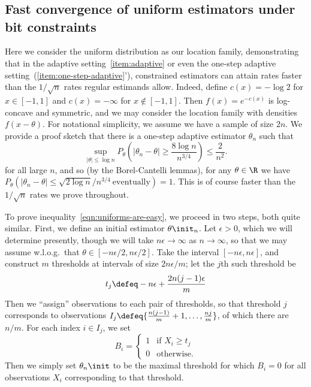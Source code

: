 
\section{}

\subsection{Fast convergence of uniform estimators under bit constraints}
\label{sec:uniform-weirdos}

Here we consider the uniform distribution as our location family,
demonstrating that in the adaptive setting~\eqref{item:adaptive} or even the
one-step adaptive setting~(\ref{item:one-step-adaptive}'), constrained
estimators can attain rates faster than the $1 / \sqrt{n}$ rates regular
estimands allow. Indeed, define $c(x) = -\log 2$ for $x \in [-1, 1]$ and
$c(x) = -\infty$ for $x \not \in [-1, 1]$. Then $f(x) = e^{-c(x)}$ is
log-concave and symmetric, and we may consider the location family with
densities $f(x - \theta)$. For notational simplicity, we assume we have
a sample of size $2n$. We provide a proof sketch that
there is a one-step adaptive estimator $\theta_n$ such that
\begin{equation}
  \label{eqn:uniforms-are-easy}
  \sup_{|\theta| \le \log n}
  P_\theta\left(|\theta_n - \theta| \ge \frac{8 \log n}{n^{3/4}}\right)
  \le \frac{2}{n^2}.
\end{equation}
for all large $n$,
and so (by the Borel-Cantelli lemmas), for any $\theta \in \R$ we have
$P_\theta(|\theta_n - \theta| \le \sqrt{2 \log n} / n^{3/4} ~
\mbox{eventually}) = 1$. This is of course faster than the $1/\sqrt{n}$
rates we prove throughout.

To prove inequality~\eqref{eqn:uniforms-are-easy}, we proceed in two steps,
both quite similar.
First, we define an initial estimator $\theta\init_n$.
Let $\epsilon > 0$, which we will determine presently, though we will
take $n \epsilon \to \infty$ as $n \to \infty$, so that we may assume
w.l.o.g.\ that $\theta \in [-n\epsilon/2, n \epsilon/2]$. Take the interval
$[-n\epsilon, n\epsilon]$, and construct
$m$ thresholds at intervals of size $2 n \epsilon / m$; let
the $j$th such threshold be
\begin{equation*}
  t_j \defeq -n \epsilon + \frac{2 n (j-1) \epsilon}{m}
\end{equation*}
Then we ``assign'' observations to each pair of thresholds, so that
threshold $j$ corresponds to observations $I_j \defeq \{\frac{n (j - 1)}{m}
+ 1, \ldots, \frac{n j}{m}\}$, of which there are $n/m$.  For each index $i
\in I_j$, we set
\begin{equation*}
  B_i = \begin{cases}
    1 & \mbox{if~} X_i \ge t_j \\
    0 & \mbox{otherwise}.
  \end{cases}
\end{equation*}
Then we simply set $\theta_n\init$ to be the maximal threshold for which
$B_i = 0$ for all observations $X_i$ corresponding to that threshold.

